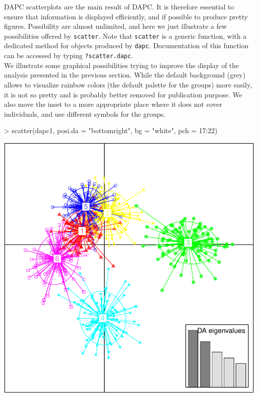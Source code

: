 \documentclass{article}
\begin{document}
DAPC scatterplots are the main result of DAPC. It is therefore essential to ensure that information
is displayed efficiently, and if possible to produce pretty figures.
Possibility are almost unlimited, and here we just illustrate a few possibilities offered by
\texttt{scatter}. Note that \texttt{scatter} is a generic function, with a dedicated method for
objects produced by \texttt{dapc}. Documentation of this function can be accessed by typing \texttt{?scatter.dapc}.
\\

We illustrate some graphical possibilities trying to improve the display of the analysis presented
in the previous section.
While the default background (grey) allows to visualize rainbow colors (the default palette for the
groups) more easily, it is not so pretty and is probably better removed for publication purpose.
We also move the inset to a more appropriate place where it does not cover individuals, and use
different symbols for the groups.

\begin{Schunk}
\begin{Sinput}
> scatter(dapc1, posi.da = "bottomright", bg = "white", pch = 17:22)
\end{Sinput}
\end{Schunk}
\includegraphics{figs/dapc-011}
\end{document}
